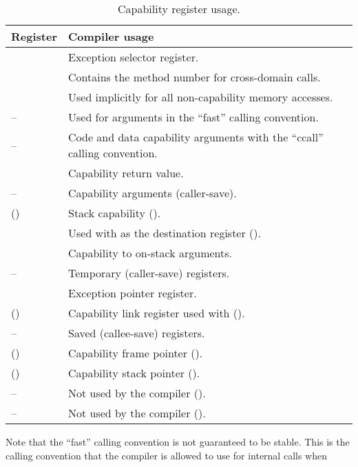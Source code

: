 \begin{table}
	\begin{center}
		\begin{tabu}{ll}
			\toprule
			\headerrow
			Register             & Compiler usage \\
			\midrule
			             & Exception selector register. \\
			             & Contains the method number for cross-domain calls.\\
			             & Used implicitly for all non-capability memory accesses.\\
			--  & Used for arguments in the ``fast'' calling convention. \\
			--   & Code and data capability arguments with the ``ccall'' calling convention. \\
			             & Capability return value. \\
			--  & Capability arguments (caller-save). \\
			 ()& Stack capability (\sandboxABI{}). \\
			            & Used with  as the destination register (\sandboxABI{}). \\
			            & Capability to on-stack arguments. \\
			-- & Temporary (caller-save) registers.\\
			            & Exception pointer register. \\
			 ()& Capability link register used with  (\sandboxABI{}).\\
			-- & Saved (callee-save) registers. \\
			 ()& Capability frame pointer (\sandboxABI{}).\\
			 ()& Capability stack pointer (\sandboxABI{}).\\
			-- & Not used by the compiler (\hybridABI{}).\\
			-- & Not used by the compiler (\sandboxABI{}).\\
			\bottomrule
		\end{tabu}
		\caption{\label{tbl:reguse}Capability register usage.}
	\end{center}
\end{table}

Note that the ``fast'' calling convention is not guaranteed to be stable.
This is the calling convention that the compiler is allowed to use for internal calls when 

